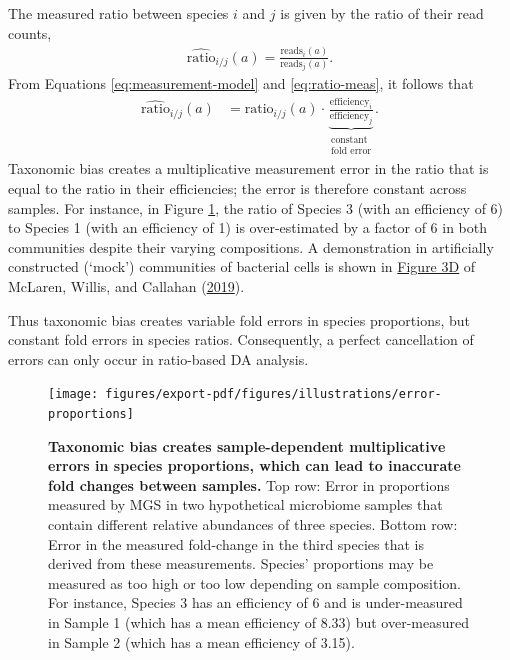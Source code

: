 \documentclass[
]{article}
\begin{document}
The measured ratio between species \(i\) and \(j\) is given by the ratio of their read counts,
\begin{align}
  \label{eq:ratio-meas}
  \widehat{\text{ratio}}_{i/j}(a) = \frac{\text{reads}_i(a)}{\text{reads}_j(a)}.
\end{align}
From Equations \eqref{eq:measurement-model} and \eqref{eq:ratio-meas}, it follows that
\begin{align}
  \label{eq:ratio-error}
  \widehat{\text{ratio}}_{i/j}(a)
  &= \text{ratio}_{i/j}(a) \cdot \underbrace{\frac{\text{efficiency}_{i}}{\text{efficiency}_{j}}}_{\substack{\text{constant} \\ \text{fold error}}}.
\end{align}
Taxonomic bias creates a multiplicative measurement error in the ratio that is equal to the ratio in their efficiencies; the error is therefore constant across samples.
For instance, in Figure \ref{fig:error-proportions}, the ratio of Species 3 (with an efficiency of 6) to Species 1 (with an efficiency of 1) is over-estimated by a factor of 6 in both communities despite their varying compositions.
A demonstration in artificially constructed (`mock') communities of bacterial cells is shown in \href{https://doi.org/10.7554/eLife.46923.004}{Figure 3D} of McLaren, Willis, and Callahan (\protect\hyperlink{ref-mclaren2019cons}{2019}).

Thus taxonomic bias creates variable fold errors in species proportions, but constant fold errors in species ratios.
Consequently, a perfect cancellation of errors can only occur in ratio-based DA analysis.

\begin{figure}
\texttt{[image: figures/export-pdf/figures/illustrations/error-proportions]} \caption{\textbf{Taxonomic bias creates sample-dependent multiplicative errors in species proportions, which can lead to inaccurate fold changes between samples.} Top row: Error in proportions measured by MGS in two hypothetical microbiome samples that contain different relative abundances of three species. Bottom row: Error in the measured fold-change in the third species that is derived from these measurements. Species' proportions may be measured as too high or too low depending on sample composition. For instance, Species 3 has an efficiency of 6 and is under-measured in Sample 1 (which has a mean efficiency of 8.33) but over-measured in Sample 2 (which has a mean efficiency of 3.15).}\label{fig:error-proportions}
\end{figure}
\end{document}
